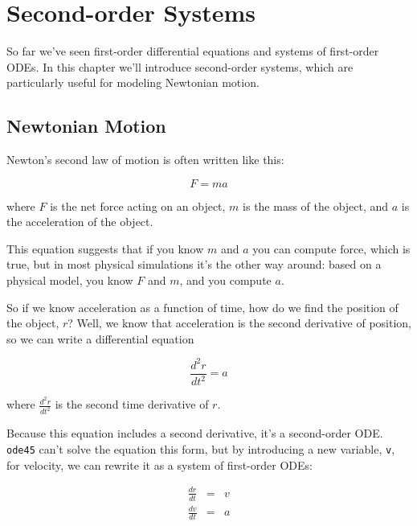 \chapter{Second-order Systems}

So far we've seen first-order differential equations and systems of first-order ODEs.  In this chapter we'll introduce second-order systems, which are particularly useful for modeling Newtonian motion.


\section{Newtonian Motion}

Newton's second law of motion is often written like this:

\begin{equation}
    F = m a
\end{equation}

where $F$ is the net force acting on an object, $m$ is the
mass of the object, and $a$ is the acceleration of the object.

This equation suggests
that if you know $m$ and $a$ you can compute force, which is true,
but in most physical simulations it's the other way around:  based on a
physical model, you know $F$ and $m$, and you compute $a$.


So if we know acceleration as a function of time, how do we
find the position of the object, $r$?  Well, we know that acceleration
is the second derivative of position, so we can write a differential
equation

\begin{equation}
    \frac{d^2r}{dt^2} = a
\end{equation}

where $\frac{d^2r}{dt^2}$ is the second time derivative of $r$.

Because this equation includes a second derivative, it's
a second-order ODE.  {\tt ode45} can't solve the equation this form, but
by introducing a new variable, {\tt v}, for velocity, we can rewrite it
as a system of first-order ODEs:

\begin{eqnarray}
    \frac{dr}{dt} &=& v   \\
    \frac{dv}{dt} &=& a
\end{eqnarray}

